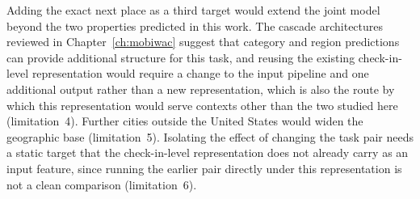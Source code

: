 
Adding the exact next place as a third target would extend the joint model beyond the
two properties predicted in this work. The cascade architectures reviewed in
Chapter~\ref{ch:mobiwac} suggest that category and region predictions can provide
additional structure for this task, and reusing the existing check-in-level
representation would require a change to the input pipeline and one additional output
rather than a new representation, which is also the route by which this representation
would serve contexts other than the two studied here (limitation~4).
Further cities outside the United States would widen the geographic base
(limitation~5).
Isolating the effect of changing the task pair needs a static target
that the check-in-level representation does not already carry as an input feature, since
running the earlier pair directly under this representation is not a clean comparison
(limitation~6).



